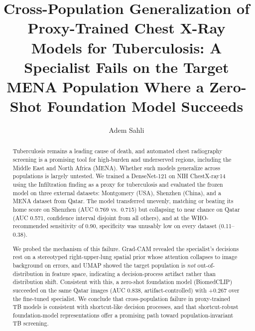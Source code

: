 \documentclass[runningheads]{llncs}
\begin{document}
\title{Cross-Population Generalization of Proxy-Trained Chest X-Ray Models for Tuberculosis: A Specialist Fails on the Target MENA Population Where a Zero-Shot Foundation Model Succeeds}

\author{Adem Sahli}

\maketitle

\begin{abstract}
Tuberculosis remains a leading cause of death, and automated chest radiography screening is a promising tool for high-burden and underserved regions, including the Middle East and North Africa (MENA). Whether such models generalize across populations is largely untested. We trained a DenseNet-121 on NIH ChestX-ray14 using the Infiltration finding as a proxy for tuberculosis and evaluated the frozen model on three external datasets: Montgomery (USA), Shenzhen (China), and a MENA dataset from Qatar. The model transferred unevenly, matching or beating its home score on Shenzhen (AUC 0.769 vs.\ 0.715) but collapsing to near chance on Qatar (AUC 0.571, confidence interval disjoint from all others), and at the WHO-recommended sensitivity of 0.90, specificity was unusably low on every dataset (0.11--0.38).

We probed the mechanism of this failure. Grad-CAM revealed the specialist's decisions rest on a stereotyped right-upper-lung spatial prior whose attention collapses to image background on errors, and UMAP showed the target population is \emph{not} out-of-distribution in feature space, indicating a decision-process artifact rather than distribution shift. Consistent with this, a zero-shot foundation model (BiomedCLIP) succeeded on the same Qatar images (AUC 0.838, artifact-controlled) with +0.267 over the fine-tuned specialist. We conclude that cross-population failure in proxy-trained TB models is consistent with shortcut-like decision processes, and that shortcut-robust foundation-model representations offer a promising path toward population-invariant TB screening.

\end{abstract}
\end{document}
